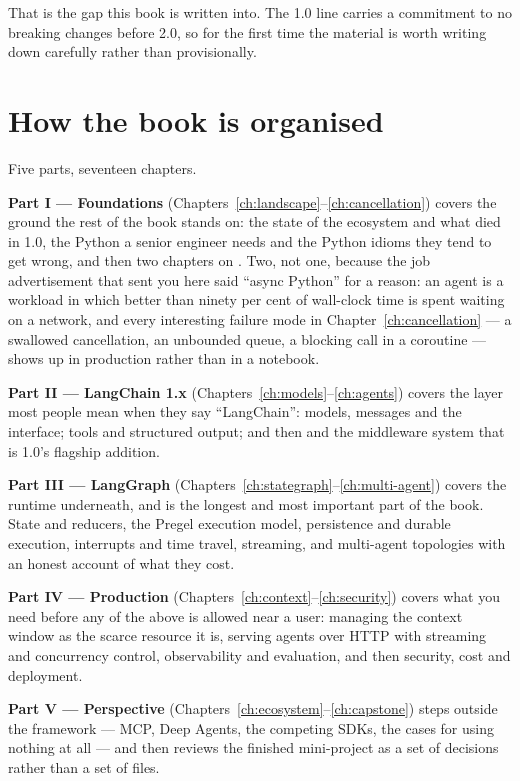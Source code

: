 That is the gap this book is written into. The 1.0 line carries a commitment to
no breaking changes before 2.0, so for the first time the material is worth
writing down carefully rather than provisionally.

\section*{How the book is organised}

Five parts, seventeen chapters.

\textbf{Part I --- Foundations}
(Chapters~\ref{ch:landscape}--\ref{ch:cancellation}) covers the ground the rest
of the book stands on: the state of the ecosystem and what died in 1.0, the
Python a senior engineer needs and the Python idioms they tend to get wrong, and
then two chapters on . Two, not one, because the job advertisement
that sent you here said ``async Python'' for a reason: an agent is a workload in
which better than ninety per cent of wall-clock time is spent waiting on a
network, and every interesting failure mode in
Chapter~\ref{ch:cancellation} --- a swallowed cancellation, an unbounded queue, a
blocking call in a coroutine --- shows up in production rather than in a notebook.

\textbf{Part II --- LangChain 1.x} (Chapters~\ref{ch:models}--\ref{ch:agents})
covers the layer most people mean when they say ``LangChain'': models, messages
and the  interface; tools and structured output; and then
 and the middleware system that is 1.0's flagship addition.

\textbf{Part III --- LangGraph} (Chapters~\ref{ch:stategraph}--\ref{ch:multi-agent})
covers the runtime underneath, and is the longest and most important part of the
book. State and reducers, the Pregel execution model, persistence and durable
execution, interrupts and time travel, streaming, and multi-agent topologies with
an honest account of what they cost.

\textbf{Part IV --- Production} (Chapters~\ref{ch:context}--\ref{ch:security})
covers what you need before any of the above is allowed near a user: managing the
context window as the scarce resource it is, serving agents over HTTP with
streaming and concurrency control, observability and evaluation, and then
security, cost and deployment.

\textbf{Part V --- Perspective} (Chapters~\ref{ch:ecosystem}--\ref{ch:capstone})
steps outside the framework --- MCP, Deep Agents, the competing SDKs, the cases
for using nothing at all --- and then reviews the finished mini-project as a set
of decisions rather than a set of files.

